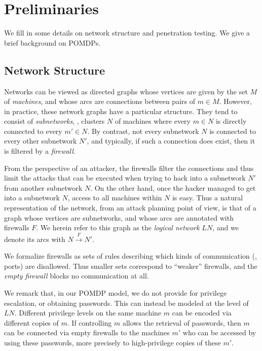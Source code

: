 \section{Preliminaries}
\label{preliminaries}

We fill in some details on network structure and penetration
testing. We give a brief background on POMDPs.



\subsection{Network Structure}


Networks can be viewed as directed graphs whose vertices are given by
the set $M$ of \emph{machines}, and whose arcs are connections between
pairs of $m \in M$. However, in practice, these network graphs have a
particular structure. They tend to consist of \emph{subnetworks}, \ie,
clusters $N$ of machines where every $m \in N$ is directly connected
to every $m' \in N$. %
By contrast, not every subnetwork $N$ is connected to every other
subnetwork $N'$, and typically, if such a connection does exist, then
it is filtered by a \emph{firewall}.

From the perspective of an attacker, the firewalls filter the
connections and thus limit the attacks that can be executed when
trying to hack into a subnetwork $N'$ from another subnetwork $N$.  On
the other hand, once the hacker managed to get into a subnetwork $N$,
access to all machines within $N$ is easy. Thus a natural
representation of the network, from an attack planning point of view,
is that of a graph whose vertices are subnetworks, and whose arcs are
annotated with firewalls $F$. We herein refer to this graph as the
\emph{logical network} $LN$, and we denote its arcs with $N
\xrightarrow{F} N'$.

We formalize firewalls as sets of rules describing which kinds of
communication (\eg, ports) are disallowed. Thus smaller sets
correspond to ``weaker'' firewalls, and the \emph{empty firewall}
blocks no communication at all.


We remark that, in our POMDP model, we do not provide for privilege
escalation, or obtaining passwords. This can instead be modeled at the
level of $LN$. Different privilege levels on the same machine $m$ can
be encoded via different copies of $m$. If controlling $m$ allows
the retrieval of passwords, then $m$ can be connected via empty firewalls
to the machines $m'$ who can be accessed by using these passwords, more
precisely to high-privilege copies of these $m'$.





